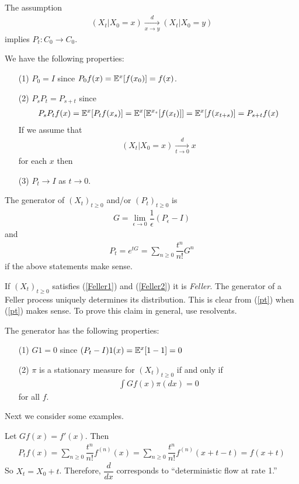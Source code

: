 \documentclass[classnotes]{fillsntsx}
\begin{document}
\begin{note}
The assumption
\begin{align}
\label{Feller1}
(X_t | X_0 = x) \xrightarrow[x \to y]{d} (X_t | X_0 =y) 
\end{align}
implies $P_t: C_0 \to C_0$.
\end{note}

We have the following properties: 
\begin{enumerate}
\item[(1)] $P_0 = I$ since $P_0 f(x) = \mathbb{E}^{x} [f(x_0)] = f(x)$. 
\item[(2)] $P_s P_t = P_{s + t}$
since
$$\begin{aligned}
P_s P_t f(x) = \mathbb{E}^{x}[P_t f(x_s) ] = \mathbb{E}^{x} [ \mathbb{E}^{x_s} [ f(x_t) ] ] 
= \mathbb{E}^{x} [ f(x_{t+s})]  
=  P_{s+t} f(x)
\end{aligned}$$
If we assume that
\begin{align}
\label{Feller2}
(X_t | X_0 = x) \xrightarrow[t \to 0]{d} x
\end{align}
for each $x$ then
\item[(3)] $P_t \to I$ as $t \to 0$. 
\end{enumerate}

\begin{defn}
The generator of $(X_t)_{t \geq 0}$ and/or $(P_t)_{t \geq 0}$ is
$$\begin{aligned}
G = \lim_{\epsilon \to 0} \dfrac{1}{\epsilon} (P_{\epsilon} - I)
\end{aligned}$$
and 
\begin{align}
\label{pt}
P_t = e^{tG} = \sum_{n \geq 0} \dfrac{t^{n}}{n!} G^n
\end{align}
if the above statements make sense. 
\end{defn}

\begin{note}
If $(X_t)_{t \geq 0}$ satisfies (\ref{Feller1}) and (\ref{Feller2}) it is {\em Feller}.
The generator of a Feller process uniquely determines its distribution. This is clear from (\ref{pt})
when (\ref{pt}) makes sense. To prove this claim in general, use resolvents. 
\end{note}
The generator has the following properties:
\begin{enumerate}
\item[(1)] $G1 = 0$ since $(P_t - I)1(x) = \mathbb{E}^{x}[1 - 1] = 0$
\item[(2)] $\pi$ is a stationary measure for $(X_t)_{t \geq 0}$ if and only if 
$$\begin{aligned}
\int G f(x) \pi (dx) = 0
\end{aligned}$$
for all $f$. 
\end{enumerate}
Next we consider some examples. 
\begin{exmp}
Let $Gf(x) = f'(x)$. Then 
$$\begin{aligned}
P_t f(x) =  \sum_{n \geq 0} \dfrac{t^{n}}{n!} f^{(n)}(x) =  \sum_{n \geq 0} \dfrac{t^{n}}{n!} f^{(n)}(x + t - t) =  f(x+t)
\end{aligned}$$
So $X_t = X_0 + t$. Therefore, $\dfrac{d}{dx}$ corresponds to ``deterministic flow at rate 1.''
\end{exmp}
\end{document}

